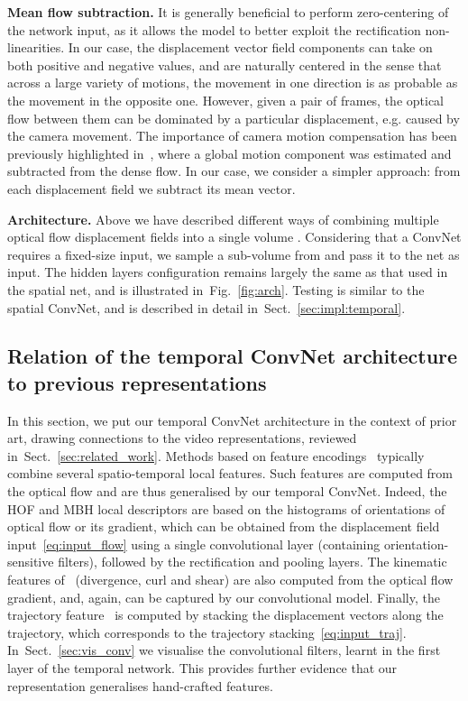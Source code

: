 \documentclass{article} \usepackage{nips14submit_e,times}
\makeatletter
\newcommand{\figref}[1]{Fig.~\ref{#1}}
\newcommand{\sref}[1]{Sect.~\ref{#1}}
\newcommand*{\eg}{e.g.\@\xspace}
\makeatother
\begin{document}
\noindent\textbf{Mean flow subtraction.}
It is generally beneficial to perform zero-centering of the network input, as it allows the model to better exploit the rectification non-linearities.
In our case, the displacement vector field components can take on both positive and negative values, and are naturally centered in the sense that across a large variety of motions,
the movement in one direction is as probable as the movement in the opposite one. However, given a pair of frames, the optical flow between them can be dominated by a particular
displacement, \eg caused by the camera movement. 
The importance of camera motion compensation has been previously highlighted in~\cite{Jain13,Wang13b}, where a global motion component was estimated and subtracted from the dense flow.
In our case, we consider a simpler approach: from each displacement field  we subtract its mean vector. 


\noindent\textbf{Architecture.} Above we have described different ways of combining multiple optical flow displacement fields into a single volume .
Considering that a ConvNet requires a fixed-size input, we sample a  sub-volume from  and pass it to the net as input.
The hidden layers configuration remains largely the same as 
that used in the spatial net, and is illustrated in~\figref{fig:arch}.
Testing is similar to the spatial ConvNet, and is described in detail in~\sref{sec:impl:temporal}.

\subsection{Relation of the temporal ConvNet architecture to previous representations}
\label{sec:rel}

In this section, we put our temporal ConvNet architecture in the
context of prior art, drawing connections to the video
representations, reviewed in~\sref{sec:related_work}.  Methods based
on feature encodings~\cite{Laptev08,Wang11b} typically combine several
spatio-temporal local features. Such features are computed from the
optical flow and are thus generalised by our temporal ConvNet.
Indeed, the HOF and MBH local descriptors are based on the
histograms of orientations of optical flow or its gradient, which can be obtained from
the displacement field input~\eqref{eq:input_flow} using a single
convolutional layer (containing orientation-sensitive filters),
followed by the rectification and pooling layers. 
The kinematic features of~\cite{Jain13} (divergence, curl and shear)
are also computed from the optical flow gradient, and, again, can be captured
by our convolutional model.  Finally, the trajectory
feature~\cite{Wang11b} is computed by stacking the displacement
vectors along the trajectory, which corresponds to the
trajectory stacking~\eqref{eq:input_traj}.  
In~\sref{sec:vis_conv} we visualise the convolutional filters, learnt in the first layer of the temporal network. 
This provides further evidence that our representation generalises hand-crafted features.
\end{document}
